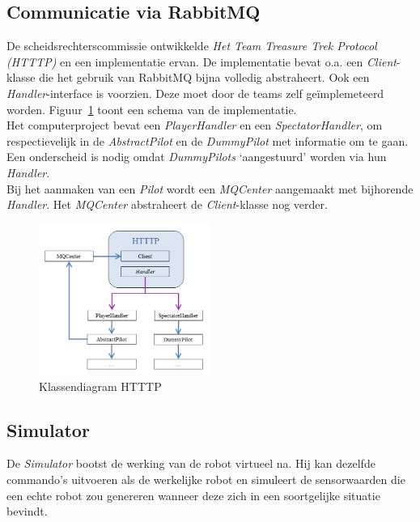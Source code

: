 \documentclass[tt2]{penoverslag}
\begin{document}
\subsection{Communicatie via RabbitMQ}
\label{ssec:RabbMQ}
De scheidsrechterscommissie ontwikkelde \textit{Het Team Treasure Trek Protocol (HTTTP)} en een implementatie ervan. De implementatie bevat o.a. een \textit{Client}-klasse die het gebruik van RabbitMQ bijna volledig abstraheert. Ook een \textit{Handler}-interface is voorzien. Deze moet door de teams zelf ge\"implemeteerd worden. Figuur~\ref{fig:klasHTTTP} toont een schema van de implementatie.\\

Het computerproject bevat een \textit{PlayerHandler} en een \textit{SpectatorHandler}, om respectievelijk in de \textit{AbstractPilot} en de \textit{DummyPilot} met informatie om te gaan. Een onderscheid is nodig omdat \textit{DummyPilots} `aangestuurd' worden via hun \textit{Handler}.\\

Bij het aanmaken van een \textit{Pilot} wordt een \textit{MQCenter} aangemaakt met bijhorende \textit{Handler}. Het \textit{MQCenter} abstraheert de \textit{Client}-klasse nog verder.

\begin{figure}[h]
\centering
	\includegraphics[width=0.5\textwidth]{KlasHTTTP}
\caption{Klassendiagram HTTTP}
\label{fig:klasHTTTP}
\end{figure}


\subsection{Simulator}
\label{ssec:Sim}
De \textit{Simulator} bootst de werking van de robot virtueel na. Hij kan dezelfde commando's uitvoeren als de werkelijke robot en simuleert de sensorwaarden die een echte robot zou genereren wanneer deze zich in een soortgelijke situatie bevindt.\\
\end{document}
